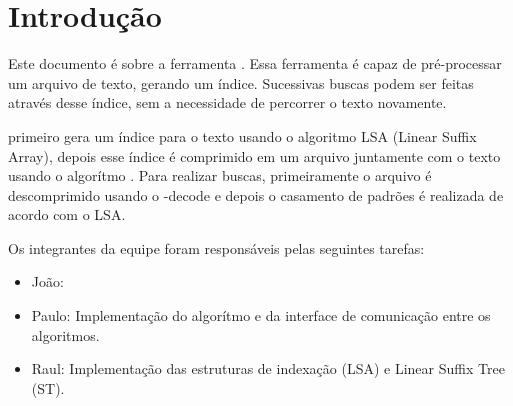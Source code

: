 \section{Introdução}

Este documento é sobre a ferramenta \ipmt. Essa ferramenta é capaz de
pré-processar um arquivo de texto, gerando um índice. Sucessivas buscas podem
ser feitas através desse índice, sem a necessidade de percorrer o texto
novamente.


\ipmt primeiro gera um índice para o texto usando o algoritmo LSA (Linear Suffix
Array), depois esse índice é comprimido em um arquivo juntamente com o texto
usando o algorítmo \lz. Para realizar buscas, primeiramente o arquivo é
descomprimido usando o \lz-decode e depois o casamento de padrões é realizada
de acordo com o LSA.


Os integrantes da equipe foram responsáveis pelas seguintes tarefas:
\begin{itemize}
\item João: 

\item Paulo: Implementação do algorítmo \lz e da interface de comunicação entre os algoritmos.

\item Raul: Implementação das estruturas de indexação \lsa (LSA) e Linear Suffix Tree (ST).

\end{itemize}

